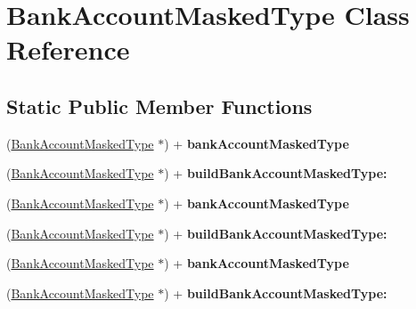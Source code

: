 \hypertarget{interface_bank_account_masked_type}{
\section{BankAccountMaskedType Class Reference}
\label{interface_bank_account_masked_type}
}
\subsection*{Static Public Member Functions}
\begin{DoxyCompactItemize}
\item 
\hypertarget{interface_bank_account_masked_type_ae9f5b1ba55dc974c856c1936627cdf14}{
(\hyperlink{interface_bank_account_masked_type}{BankAccountMaskedType} $\ast$) + {\bfseries bankAccountMaskedType}}
\label{interface_bank_account_masked_type_ae9f5b1ba55dc974c856c1936627cdf14}

\item 
\hypertarget{interface_bank_account_masked_type_a3bcac3594527e183915588b0ce6914ce}{
(\hyperlink{interface_bank_account_masked_type}{BankAccountMaskedType} $\ast$) + {\bfseries buildBankAccountMaskedType:}}
\label{interface_bank_account_masked_type_a3bcac3594527e183915588b0ce6914ce}

\item 
\hypertarget{interface_bank_account_masked_type_ae9f5b1ba55dc974c856c1936627cdf14}{
(\hyperlink{interface_bank_account_masked_type}{BankAccountMaskedType} $\ast$) + {\bfseries bankAccountMaskedType}}
\label{interface_bank_account_masked_type_ae9f5b1ba55dc974c856c1936627cdf14}

\item 
\hypertarget{interface_bank_account_masked_type_a3bcac3594527e183915588b0ce6914ce}{
(\hyperlink{interface_bank_account_masked_type}{BankAccountMaskedType} $\ast$) + {\bfseries buildBankAccountMaskedType:}}
\label{interface_bank_account_masked_type_a3bcac3594527e183915588b0ce6914ce}

\item 
\hypertarget{interface_bank_account_masked_type_ae9f5b1ba55dc974c856c1936627cdf14}{
(\hyperlink{interface_bank_account_masked_type}{BankAccountMaskedType} $\ast$) + {\bfseries bankAccountMaskedType}}
\label{interface_bank_account_masked_type_ae9f5b1ba55dc974c856c1936627cdf14}

\item 
\hypertarget{interface_bank_account_masked_type_a3bcac3594527e183915588b0ce6914ce}{
(\hyperlink{interface_bank_account_masked_type}{BankAccountMaskedType} $\ast$) + {\bfseries buildBankAccountMaskedType:}}
\label{interface_bank_account_masked_type_a3bcac3594527e183915588b0ce6914ce}

\end{DoxyCompactItemize}
